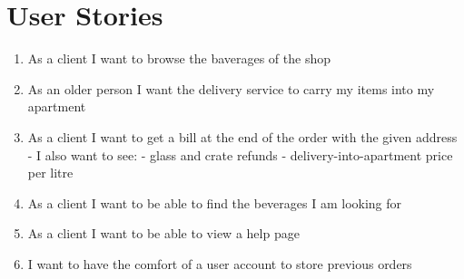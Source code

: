 \documentclass[a4paper, 11pt]{article}
\begin{document}
\section{User Stories}
\begin{enumerate}
	\item As a client I want to browse the baverages of the shop
	\item As an older person I want the delivery service to carry my items into my apartment
	\item As a client I want to get a bill at the end of the order with the given address
		- I also want to see:
			- glass and crate refunds
			- delivery-into-apartment price per litre
	\item As a client I want to be able to find the beverages I am looking for
	\item As a client I want to be able to view a help page
	\item I want to have the comfort of a user account to store previous orders
	\end{enumerate}
\end{document}
